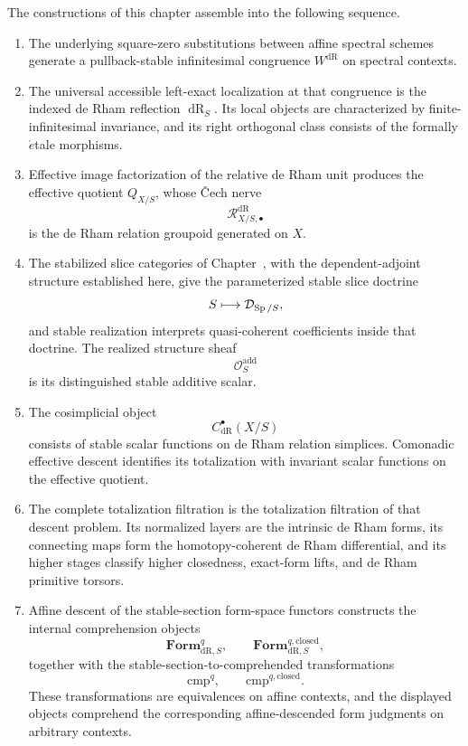 \begin{theorem}
\label{thm:doctrinal-recognition-spectral-de-Rham}
The constructions of this chapter assemble into the following sequence.
\begin{enumerate}[label=(\roman*)]
  \item The underlying square-zero substitutions between affine spectral schemes generate a pullback-stable
  infinitesimal congruence \(W^{\mathrm{dR}}\) on spectral contexts.

  \item The universal accessible left-exact localization at that congruence is the
  indexed de Rham reflection \(\operatorname{dR}_S\). Its local objects are
  characterized by finite-infinitesimal invariance, and its right
  orthogonal class consists of the formally \(\acute{e}\)tale morphisms.

  \item Effective image factorization of the relative de Rham unit produces the
  effective quotient \(Q_{X/S}\), whose \v{C}ech nerve
  \[
    \mathcal R^{\mathrm{dR}}_{X/S,\bullet}
  \]
  is the de Rham relation groupoid generated on \(X\).

  \item The stabilized slice categories of
  Chapter~, with the dependent-adjoint
  structure established here, give the parameterized stable slice doctrine
  \[
    S\longmapsto\mathcal D_{\operatorname{Sp}/S},
  \]
  and stable realization interprets quasi-coherent coefficients inside that
  doctrine. The realized structure sheaf
  \[
    \mathcal O_S^{\mathrm{add}}
  \]
  is its distinguished stable additive scalar.

  \item The cosimplicial object
  \[
    C^\bullet_{\mathrm{dR}}(X/S)
  \]
  consists of stable scalar functions on de Rham relation simplices.
  Comonadic effective descent identifies its totalization with invariant scalar
  functions on the effective quotient.

  \item The complete totalization filtration is the totalization filtration of that
  descent problem. Its normalized layers are the intrinsic de Rham forms, its
  connecting maps form the homotopy-coherent de Rham differential, and its higher
  stages classify higher closedness, exact-form lifts, and de Rham primitive
  torsors.

  \item Affine descent of the stable-section form-space functors constructs the internal
  comprehension objects
  \[
    \mathbf{Form}^q_{\mathrm{dR},S},
    \qquad
    \mathbf{Form}^{q,\mathrm{closed}}_{\mathrm{dR},S},
  \]
  together with the stable-section-to-comprehended transformations
  \[
    \mathrm{cmp}^q,
    \qquad
    \mathrm{cmp}^{q,\mathrm{closed}}.
  \]
  These transformations are equivalences on affine contexts, and the displayed
  objects comprehend the corresponding affine-descended form judgments on
  arbitrary contexts.


\end{enumerate}
\end{theorem}
